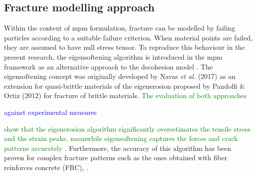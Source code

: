 \message{ !name(2020_EFM_MPM_Eigensoftening.tex)}\documentclass[preprint,12pt,a4paper]{elsarticle}
\newcommand{\MMP}[1]{
  \textcolor{blue}{{#1}}
}
\newcommand{\DM}[1]{
  \textcolor{green}{{#1}}
}
\begin{document}
\subsection{Fracture modelling approach}
\label{sec:2.3}
Within the context of \acrshort{mpm} formulation, fracture can be
modelled by failing particles according to a suitable failure
criterion. When material points are failed, they are assumed to have
null stress tensor. To reproduce this behaviour in the present
research, the eigensoftening algorithm is introduced in the 
\acrshort{mpm} framework as an alternative approach to the decohesion
model \cite{Zhenmao_2005,Schreyer_2002}. The eigensoftening concept
was originally developed by Navas {\it et al.}
(2017)\cite{Navas_2017_ES} as an extension for quasi-brittle materials
of the eigenerosion proposed by Pandolfi \& Ortiz
(2012)\cite{Pandolfi_2012} for fracture of brittle materials.\DM{The
  evaluation of both approaches \cite{Navas_2017_ES}}\MMP{against
  experimental measures}\DM{show that the eigenerosion algorithm significantly overestimates the tensile stress and the strain peaks, meanwhile eigensoftening captures the forces and crack
patterns accurately}. Furthermore,
the accuracy of this algorithm has been proven for complex fracture
patterns such as the ones obtained with fiber reinforces concrete (FRC),
\cite{Navas_2018_ES}.\\
\end{document}
